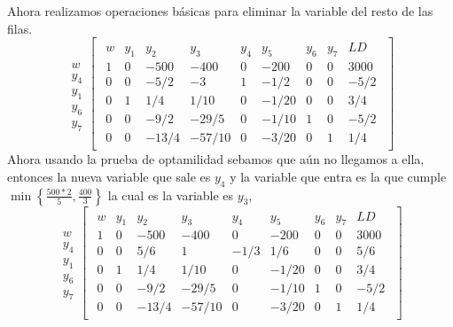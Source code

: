 \documentclass[11pt,letterpaper]{article}
\begin{document}
\begin{enumerate}
Ahora realizamos operaciones básicas para eliminar la variable del resto de las filas.
\begin{equation}
\begin{array}{c}
\\
w \\
y_4\\
y_1 \\
y_6 \\
y_7 
\end{array}
\begin{bmatrix}
\begin{array}{c||cccccccc}
  w & y_1 & y_2 & y_3 & y_4 & y_5 & y_6 & y_7 & LD \\ \hline \hline
  1 & 0 &-500 &-400& 0 &-200 & 0 & 0 & 3000\\ 
  0 & 0 & -5/2 & -3 & 1 & -1/2 & 0 & 0 & -5/2  \\
  0 & 1 & 1/4& 1/10 & 0 &-1/20 & 0 & 0 & 3/4 \\
  0 & 0 & -9/2& -29/5 & 0 & -1/10 & 1 & 0 &  -5/2 \\
  0 & 0 & -13/4 & -57/10 & 0 & -3/20 & 0 & 1 &  1/4
\end{array}
\end{bmatrix}
\end{equation}
Ahora usando la prueba de optamilidad sebamos que aún no llegamos a ella, entonces la nueva variable que sale es $y_4$ y la variable que entra es la que cumple $\min \left\{\frac{500*2}{5}, \frac{400}{3} \right\}$ la cual es la variable es $y_3$,
\begin{equation}
\begin{array}{c}
\\
w \\
y_4\\
y_1 \\
y_6 \\
y_7 
\end{array}
\begin{bmatrix}
\begin{array}{c||cccccccc}
  w & y_1 & y_2 & y_3 & y_4 & y_5 & y_6 & y_7 & LD \\ \hline \hline
  1 & 0 &-500 &-400& 0 &-200 & 0 & 0 & 3000\\ 
  0 & 0 & 5/6 & 1 & -1/3 & 1/6 & 0 & 0 & 5/6  \\
  0 & 1 & 1/4& 1/10 & 0 &-1/20 & 0 & 0 & 3/4 \\
  0 & 0 & -9/2& -29/5 & 0 & -1/10 & 1 & 0 &  -5/2 \\
  0 & 0 & -13/4 & -57/10 & 0 & -3/20 & 0 & 1 &  1/4
\end{array}

\end{bmatrix}
\end{equation}
\end{enumerate}
\end{document}
